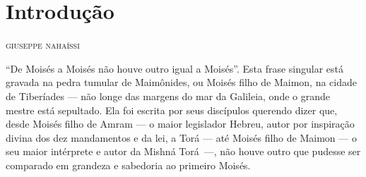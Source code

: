 %


%
%
%
%

\chapter{Introdução}

\begin{flushright}
\textsc{giuseppe nahaïssi}
\end{flushright}

\noindent{}``De Moisés a Moisés não houve outro igual a Moisés''. Esta frase
singular está gravada na pedra tumular de Maimônides, ou Moisés filho
de Maimon, na cidade de Tiberíades --- não longe das margens do mar da
Galileia, onde o grande mestre está sepultado. Ela foi escrita por
seus discípulos querendo dizer que, desde Moisés filho de Amram --- o
maior legislador Hebreu, autor por inspiração divina dos dez mandamentos
e da lei, a Torá --- até Moisés filho de Maimon --- o seu maior
intérprete e autor da Mishná Torá~---, não houve outro que
pudesse ser comparado em grandeza e sabedoria ao primeiro Moisés.


